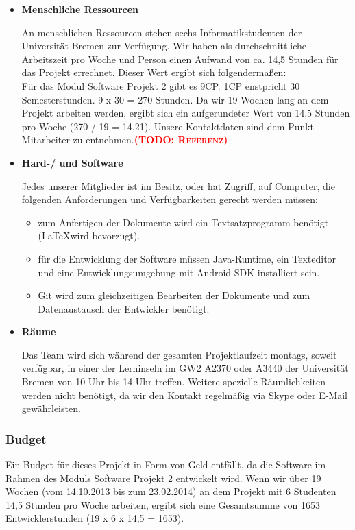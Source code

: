 \documentclass[fontsize=12pt,paper=a4,twoside]{scrartcl}
\newcommand{\todo}[1]{\textbf{\textsc{\textcolor{red}{(TODO: #1)}}}}
\begin{document}
\begin{itemize}
\item \textbf{Menschliche Ressourcen}

An menschlichen Ressourcen stehen sechs Informatikstudenten der Universität Bremen zur Verfügung. Wir haben als durchschnittliche Arbeitszeit pro Woche und Person einen Aufwand von ca. 14,5 Stunden für das Projekt errechnet. Dieser Wert ergibt sich folgendermaßen:\\
Für das Modul Software Projekt 2 gibt es 9CP. 1CP enstpricht 30 Semesterstunden. 9 x 30 = 270 Stunden. Da wir 19 Wochen lang an dem Projekt arbeiten werden, ergibt sich ein aufgerundeter Wert von 14,5 Stunden pro Woche (270 / 19 = 14,21). Unsere Kontaktdaten sind dem Punkt Mitarbeiter zu entnehmen.\todo{Referenz}

\item \textbf{Hard-/ und Software}

Jedes unserer Mitglieder ist im Besitz, oder hat Zugriff, auf Computer, die folgenden Anforderungen und Verfügbarkeiten gerecht werden müssen:

\begin{itemize}
\item zum Anfertigen der Dokumente wird ein Textsatzprogramm benötigt (\LaTeX wird bevorzugt).
\item für die Entwicklung der Software müssen Java-Runtime, ein Texteditor und eine Entwicklungsumgebung mit Android-SDK installiert sein.
\item Git wird zum gleichzeitigen Bearbeiten der Dokumente und zum Datenaustausch der Entwickler benötigt.
\end{itemize}

\item \textbf{Räume}

Das Team wird sich während der gesamten Projektlaufzeit montags, soweit verfügbar, in einer der Lerninseln im GW2 A2370 oder A3440 der Universität Bremen von 10 Uhr bis 14 Uhr treffen. Weitere spezielle Räumlichkeiten werden nicht benötigt, da wir den Kontakt regelmäßig via Skype oder E-Mail gewährleisten.

\end{itemize}

\subsubsection{Budget}

Ein Budget für dieses Projekt in Form von Geld entfällt, da die Software im Rahmen des Moduls Software Projekt 2 entwickelt wird. Wenn wir über 19 Wochen (vom 14.10.2013 bis zum 23.02.2014) an dem Projekt mit 6 Studenten 14,5 Stunden pro Woche arbeiten, ergibt sich eine Gesamtsumme von 1653 Entwicklerstunden (19 x 6 x 14,5 = 1653).
\end{document}

